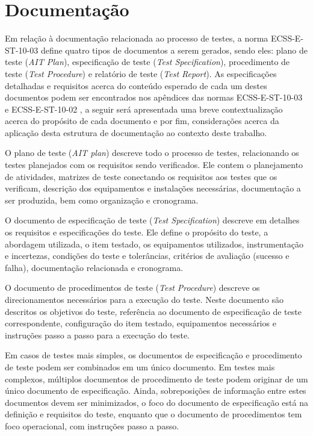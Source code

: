 \section{Documentação}

Em relação à documentação relacionada ao processo de testes, a norma ECSS-E-ST-10-03 \cite{ecss-e-st-10-03} define quatro tipos de documentos a serem gerados, sendo eles: plano de teste (\textit{AIT Plan}), especificação de teste (\textit{Test Specification}), procedimento de teste (\textit{Test Procedure}) e relatório de teste (\textit{Test Report}).
As especificações detalhadas e requisitos acerca do conteúdo esperado de cada um destes documentos podem ser encontrados nos apêndices das normas ECSS-E-ST-10-03 \cite{ecss-e-st-10-03} e ECSS-E-ST-10-02 \cite{ecss-e-st-10-02}, a seguir será apresentada uma breve contextualização acerca do propósito de cada documento e por fim, considerações acerca da aplicação desta estrutura de documentação ao contexto deste trabalho.


O plano de teste (\textit{AIT plan}) descreve todo o processo de testes, relacionando os testes planejados com os requisitos sendo verificados.
Ele contem o planejamento de atividades, matrizes de teste conectando os requisitos aos testes que os verificam, descrição dos equipamentos e instalações necessárias, documentação a ser produzida, bem como organização e cronograma.


O documento de especificação de teste (\textit{Test Specification}) descreve em detalhes os requisitos e especificações do teste.
Ele define o propósito do teste, a abordagem utilizada, o item testado, os equipamentos utilizados, instrumentação e incertezas, condições do teste e tolerâncias, critérios de avaliação (sucesso e falha), documentação relacionada e cronograma.


O documento de procedimentos de teste (\textit{Test Procedure}) descreve os direcionamentos necessários para a execução do teste.
Neste documento são descritos os objetivos do teste, referência ao documento de especificação de teste correspondente, configuração do item testado, equipamentos necessários e instruções passo a passo para a execução do teste.

Em casos de testes mais simples, os documentos de especificação e procedimento de teste podem ser combinados em um único documento.
Em testes mais complexos, múltiplos documentos de procedimento de teste podem originar de um único documento de especificação.
Ainda, sobreposições de informação entre estes documentos devem ser minimizados, o foco do documento de especificação está na definição e requisitos do teste, enquanto que o documento de procedimentos tem foco operacional, com instruções passo a passo.


